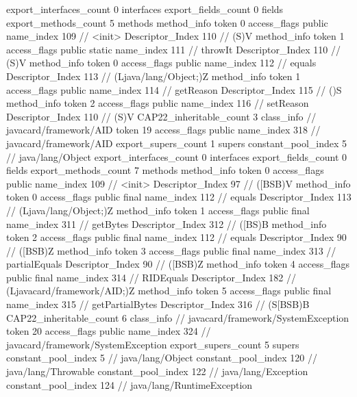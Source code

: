 {{{{			}
			export_interfaces_count	0
			interfaces {
			}
			export_fields_count	0
			fields {
			}
			export_methods_count	5
			methods {
				method_info {
					token	0
					access_flags	public
					name_index	109		// <init>
					Descriptor_Index	110		// (S)V
				}
				method_info {
					token	1
					access_flags	public static
					name_index	111		// throwIt
					Descriptor_Index	110		// (S)V
				}
				method_info {
					token	0
					access_flags	public
					name_index	112		// equals
					Descriptor_Index	113		// (Ljava/lang/Object;)Z
				}
				method_info {
					token	1
					access_flags	public
					name_index	114		// getReason
					Descriptor_Index	115		// ()S
				}
				method_info {
					token	2
					access_flags	public
					name_index	116		// setReason
					Descriptor_Index	110		// (S)V
				}
			}
			CAP22_inheritable_count	3
		}
		class_info {		// javacard/framework/AID
			token	19
			access_flags	public
			name_index	318		// javacard/framework/AID
			export_supers_count	1
			supers {
				constant_pool_index	5		// java/lang/Object
			}
			export_interfaces_count	0
			interfaces {
			}
			export_fields_count	0
			fields {
			}
			export_methods_count	7
			methods {
				method_info {
					token	0
					access_flags	public
					name_index	109		// <init>
					Descriptor_Index	97		// ([BSB)V
				}
				method_info {
					token	0
					access_flags	public final
					name_index	112		// equals
					Descriptor_Index	113		// (Ljava/lang/Object;)Z
				}
				method_info {
					token	1
					access_flags	public final
					name_index	311		// getBytes
					Descriptor_Index	312		// ([BS)B
				}
				method_info {
					token	2
					access_flags	public final
					name_index	112		// equals
					Descriptor_Index	90		// ([BSB)Z
				}
				method_info {
					token	3
					access_flags	public final
					name_index	313		// partialEquals
					Descriptor_Index	90		// ([BSB)Z
				}
				method_info {
					token	4
					access_flags	public final
					name_index	314		// RIDEquals
					Descriptor_Index	182		// (Ljavacard/framework/AID;)Z
				}
				method_info {
					token	5
					access_flags	public final
					name_index	315		// getPartialBytes
					Descriptor_Index	316		// (S[BSB)B
				}
			}
			CAP22_inheritable_count	6
		}
		class_info {		// javacard/framework/SystemException
			token	20
			access_flags	public
			name_index	324		// javacard/framework/SystemException
			export_supers_count	5
			supers {
				constant_pool_index	5		// java/lang/Object
				constant_pool_index	120		// java/lang/Throwable
				constant_pool_index	122		// java/lang/Exception
				constant_pool_index	124		// java/lang/RuntimeException
}}}}
